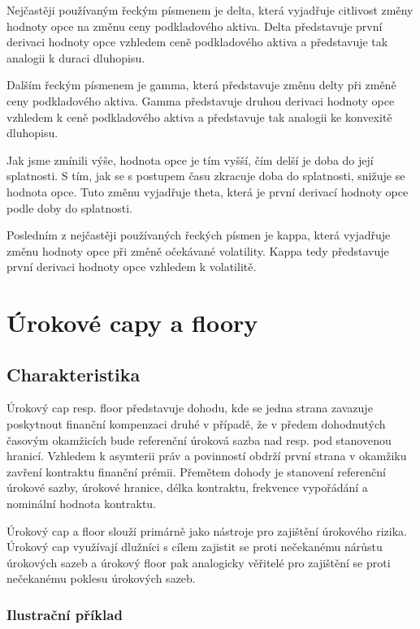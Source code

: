 \documentclass[a4paper]{book}
\begin{document}
Nejčastěji používaným řeckým písmenem je delta, která vyjadřuje citlivost změny hodnoty opce na změnu ceny podkladového aktiva. Delta představuje první derivaci hodnoty opce vzhledem ceně podkladového aktiva a představuje tak analogii k duraci dluhopisu.

Dalším řeckým písmenem je gamma, která představuje změnu delty při změně ceny podkladového aktiva. Gamma představuje druhou derivaci hodnoty opce vzhledem k ceně podkladového aktiva a představuje tak analogii ke konvexitě dluhopisu.

Jak jsme zmínili výše, hodnota opce je tím vyšší, čím delší je doba do její splatnosti. S tím, jak se s postupem času zkracuje doba do splatnosti, snižuje se hodnota opce. Tuto změnu vyjadřuje theta, která je první derivací hodnoty opce podle doby do splatnosti.

Posledním z nejčastěji používaných řeckých písmen je kappa, která vyjadřuje změnu hodnoty opce při změně očekávané volatility. Kappa tedy představuje první derivaci hodnoty opce vzhledem k volatilitě.

\section{Úrokové capy a floory}

\subsection{Charakteristika}

Úrokový cap resp. floor představuje dohodu, kde se jedna strana zavazuje poskytnout finanční kompenzaci druhé v případě, že v předem dohodnutých časovým okamžicích bude referenční úroková sazba nad resp. pod stanovenou hranicí. Vzhledem k asymterii práv a povinností obdrží první strana v okamžiku zavření kontraktu finanční prémii. Přemětem dohody je stanovení referenční úrokové sazby, úrokové hranice, délka kontraktu, frekvence vypořádání a nominální hodnota kontraktu.

Úrokový cap a floor slouží primárně jako nástroje pro zajištění úrokového rizika. Úrokový cap využívají dlužníci s cílem zajistit se proti nečekanému nárůstu úrokových sazeb a úrokový floor pak analogicky věřitelé pro zajištění se proti nečekanému poklesu úrokových sazeb.

\subsubsection{Ilustrační příklad}
\end{document}
